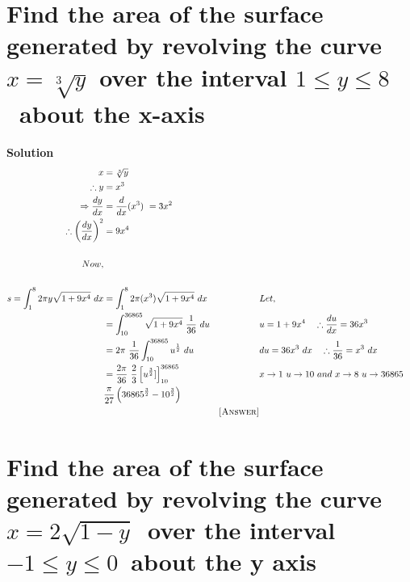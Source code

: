 \documentclass[12pt]{article}
\begin{document}
\section{Find the area of the surface generated by revolving the curve $x=\sqrt[3]{y}$ over the interval $1\leq y \leq 8$\ about the x-axis}




\textbf{Solution}
\begin{align*}
    x&=\sqrt[3]{y}\\
    \therefore y&=x^3\\
    \Rightarrow\frac{dy}{dx}&=\frac{d}{dx}(x^3)\ =3x^2\\
    \therefore\left(\frac{dy}{dx}\right)^2&=9x^4\\\\
    Now,\\\\ s=\int_{1}^{8}2\pi y\sqrt{1+9x^4}\ dx
    &=\int_{1}^{8}2\pi(x^3)\sqrt{1+9x^4}\ dx & & Let,\\
    &=\int_{10}^{36865}\sqrt{1+9x^4}\ \frac{1}{36}\ du & & u=1+9x^4\quad \therefore \frac{du}{dx}=36x^3\\
    &=2\pi\ \frac{1}{36}\int_{10}^{36865}u^{\frac{1}{2}}\ du & & du=36x^3\ dx \quad\therefore \frac{1}{36}=x^3\ dx\\
    &=\frac{2\pi}{36}\ \frac{2}{3}\left[u^{\frac{3}{2}}]\right]_{10}^{36865} & & x\rightarrow1\ u\rightarrow10\ and\ x\rightarrow8\ u\rightarrow36865\\
    &\frac{\pi}{27}\left(36865^{\frac{3}{2}}-10^{\frac{3}{2}}\right)\\
    & & \textsc{[Answer]}
\end{align*}
\pagebreak


\section{Find the area of the surface generated by revolving the curve $x=2\sqrt{1-y}$\ over the interval\ $-1\leq y \leq 0$\ about the y axis}


\end{document}
